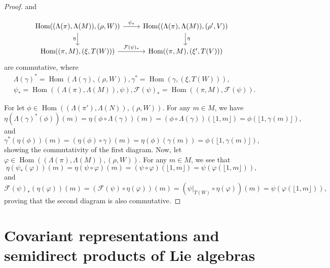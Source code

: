 \documentclass[11pt]{amsart}
\numberwithin{equation}{section}
\theoremstyle{definition}
\theoremstyle{remark}
\newcommand{\F}{\mathcal{F}}
\newcommand{\Hom}{\operatorname{Hom}}
\begin{document}
\begin{proof}
    
    and 
    
   \[
        \begin{tikzcd}
           \Hom((\Lambda (\pi), \Lambda(M)), (\rho, W)) 
            \arrow[r, "\psi_*"] 
            \arrow[d, "\eta"'] 
            & \Hom((\Lambda (\pi), \Lambda(M)), (\rho', V)) 
            \arrow[d, "\eta"] \\
            \Hom((\pi , M), (\xi, T(W))) 
            \arrow[r, "\F(\psi)_*"] 
            & \Hom((\pi , M), (\xi', T(V)))
        \end{tikzcd}
    \]  
     are commutative, where 
     \begin{align*}
     &\Lambda(\gamma)^* = \Hom (\Lambda (\gamma ), (\rho , W)), 
     {\gamma} ^*= \Hom (\gamma , (\xi , T(W))),\\
     &\psi _* = \Hom ((\Lambda(\pi), \Lambda (M)), \psi), \F(\psi)_* = \Hom ((\pi,M), \F (\psi) ) .
    \end{align*} 
    

   For let \(\phi \in \Hom((\Lambda({\pi}'), \Lambda(N)), (\rho, W))\). For any \(m \in M\), we have
    \[
        \eta(\Lambda(\gamma)^*(\phi))(m) = \eta(\phi \circ \Lambda(\gamma))(m) = (\phi \circ \Lambda(\gamma))(\lfloor 1, m \rfloor) = \phi(\lfloor 1, \gamma(m) \rfloor),
    \]
    and
    \[
        \gamma^*(\eta(\phi))(m) = (\eta(\phi) \circ \gamma)(m) = \eta(\phi)(\gamma(m)) = \phi(\lfloor 1, \gamma(m) \rfloor),
    \]
     showing  the commutativity of the  first diagram. Now, let \(\varphi \in \Hom((\Lambda(\pi), \Lambda(M)), (\rho, W))\). For any \(m \in M\), we see that
    \[
        \eta(\psi_*(\varphi))(m) = \eta(\psi \circ \varphi)(m) = (\psi \circ \varphi)(\lfloor 1, m \rfloor) = \psi(\varphi(\lfloor 1, m \rfloor)),
    \]
    and
    \[
        \F(\psi)_*(\eta(\varphi))(m) = (\F(\psi) \circ \eta(\varphi))(m) = (\psi|_{T(W)} \circ \eta(\varphi))(m) = \psi(\varphi(\lfloor 1, m \rfloor)),
    \]
    proving that the second diagram is also commutative.
\end{proof}



\section{Covariant representations and semidirect products of Lie algebras}
\end{document}
